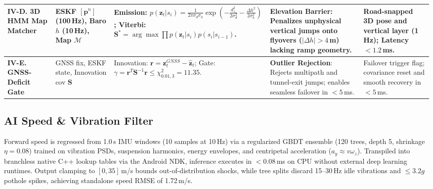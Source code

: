 \documentclass[conference]{IEEEtran}
\begin{document}
\begin{table}[t]
{\begin{tabular}{|p{2.5cm}|p{2.0cm}|p{6.6cm}|p{4.2cm}|p{2.8cm}|}
\hline
\textbf{IV-D. 3D HMM Map Matcher} & ESKF $[\mathbf{p}^n]$ (100\,Hz), Baro $h$ (10\,Hz), Map $\mathcal{M}$ & Emission: $p(\mathbf{z}_t|s_i) = \frac{1}{2\pi\sigma_d\sigma_h}\exp\left(-\frac{d_{\perp}^2}{2\sigma_d^2} - \frac{\Delta h^2}{2\sigma_h^2}\right)$ \cite{newson2009}; Viterbi: $\mathbf{S}^* = \arg\max \prod p(\mathbf{z}_t|s_i)p(s_i|s_{i-1})$. & \textbf{Elevation Barrier}: Penalizes unphysical vertical jumps onto flyovers ($|\Delta h| > 4$\,m) lacking ramp geometry. & Road-snapped 3D pose and vertical layer (1\,Hz); Latency $<1.2$\,ms. \\
\hline
\textbf{IV-E. GNSS-Deficit Gate} & GNSS fix, ESKF state, Innovation cov $\mathbf{S}$ & Innovation: $\mathbf{r} = \mathbf{z}_t^{GNSS} - \hat{\mathbf{z}}_t$; Gate: $\gamma = \mathbf{r}^T\mathbf{S}^{-1}\mathbf{r} \leq \chi^2_{0.01, 3} = 11.35$. & \textbf{Outlier Rejection}: Rejects multipath and tunnel-exit jumps; enables seamless failover in $<5$\,ms. & Failover trigger flag; covariance reset and smooth recovery in $<5$\,ms. \\
\hline
\end{tabular}%
}
\end{table}

\subsection{AI Speed \& Vibration Filter}
Forward speed is regressed from 1.0\,s IMU windows (10 samples at 10\,Hz) via a regularized GBDT ensemble \cite{friedman2001} (120 trees, depth 5, shrinkage $\eta=0.08$) trained on vibration PSDs, suspension harmonics, energy envelopes, and centripetal acceleration ($a_y \approx v\omega_z$). Transpiled into branchless native C++ lookup tables via the Android NDK, inference executes in $<0.08$\,ms on CPU without external deep learning runtimes. Output clamping to $[0, 35]$\,m/s bounds out-of-distribution shocks, while tree splits discard 15--30\,Hz idle vibrations and $\le 3.2g$ pothole spikes, achieving standalone speed RMSE of 1.72\,m/s.
\end{document}

